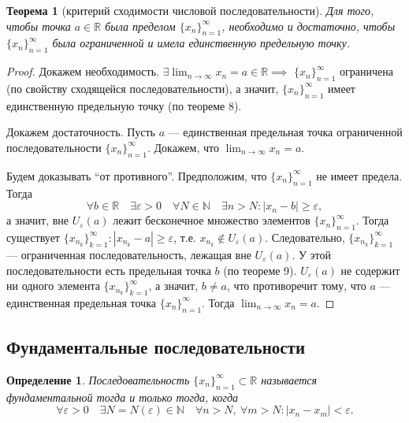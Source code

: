 \documentclass[a4paper,12pt]{article} %
\newtheorem{definition}{Определение}[section]
\newtheorem{theorem}{Теорема}[section]
\theoremstyle{remark}
\theoremstyle{definition}
\begin{document}
\begin{theorem}[критерий сходимости числовой последовательности]
	Для того, чтобы точка $a\in \mathbb{R}$ была пределом $\{x_n\}_{n=1}^{\infty}$, необходимо и достаточно,
    чтобы $\{x_n\}_{n=1}^{\infty}$ была ограниченной и имела единственную предельную точку.
\end{theorem}
\begin{proof}
	Докажем необходимость.
	$\displaystyle \exists \lim_{n \to \infty} x_n = a \in \mathbb{R} \implies$ $\{x_n\}_{n=1}^{\infty}$ ограничена 
    (по свойству сходящейся последовательности), а значит,
    $\{x_n\}_{n=1}^{\infty}$ имеет единственную предельную точку (по теореме 8).
	
	Докажем достаточность. Пусть $a$ --- единственная предельная точка ограниченной последовательности $\{x_n\}_{n=1}^{\infty}$.
    Докажем, что $\displaystyle \lim_{n \to \infty} x_n = a$.

	Будем доказывать ``от противного''. Предположим, что $\{x_n\}_{n=1}^{\infty}$ не имеет предела. Тогда
	\[ \forall b\in \mathbb{R} \quad \exists \varepsilon>0 \quad \forall N\in \mathbb{N} \quad \exists n>N :
    |x_n - b| \ge \varepsilon ,\] 
	а значит, вне $U_\varepsilon(a)$ лежит бесконечное множество элементов $\{x_n\}_{n=1}^{\infty}$.
    Тогда существует $\{x_{n_k}\}_{k=1}^{\infty} : |x_{n_k} - a| \ge \varepsilon$, т.е.
    $x_{n_k}\not\in U_\varepsilon(a)$. Следовательно, $\{x_{n_k}\}_{k=1}^{\infty}$ --- ограниченная последовательность,
    лежащая вне $U_\varepsilon(a)$. У этой последовательности есть предельная точка $b$ (по теореме 9).
    $U_\varepsilon(a)$ не содержит ни одного элемента $\{x_{n_k}\}_{k=1}^{\infty}$, а значит, $b\neq a$,
    что противоречит тому, что $a$ --- единственная предельная точка $\{x_n\}_{n=1}^{\infty}$.
    Тогда $\displaystyle \lim_{n \to \infty} x_n = a$.
\end{proof}



\subsection{Фундаментальные последовательности}
\begin{definition}
	Последовательность $\{x_n\}_{n=1}^{\infty} \subset  \mathbb{R}$ называется фундаментальной тогда и только тогда, когда
	\[
	\forall \varepsilon>0 \quad \exists N=N(\varepsilon) \in  \mathbb{N} \quad \forall n>N, \ \forall m>N : |x_n-x_m|<\varepsilon
	.\] 
\end{definition}
\end{document}
